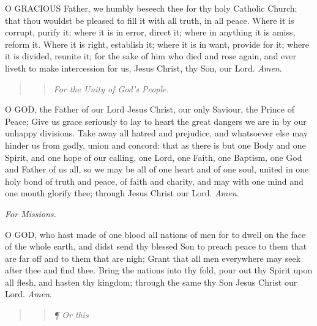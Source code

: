 O
GRACIOUS Father, we humbly beseech thee for thy holy Catholic Church;
that thou wouldst be pleased to fill it with all truth, in all peace.
Where it is corrupt, purify it; where it is in error, direct it; where
in anything it is amiss, reform it. Where it is right, establish it; where
it is in want, provide for it; where it is divided, reunite it; for the
sake of him who died and rose again, and ever liveth to make intercession
for us, Jesus Christ, thy Son, our Lord. \emph{Amen}.

\begin{quote}

\begin{quote}

\emph{For
the Unity of God’s People.}

\end{quote}

\end{quote}

O
GOD, the Father of our Lord Jesus Christ, our only Saviour, the Prince
of Peace; Give us grace seriously to lay to heart the great dangers we
are in by our unhappy divisions. Take away all hatred and prejudice, and
whatsoever else may hinder us from godly, union and concord: that as there
is but one Body and one Spirit, and one hope of our calling, one Lord,
one Faith, one Baptism, one God and Father of us all, so we may be all
of one heart and of one soul, united in one holy bond of truth and peace,
of faith and charity, and may with one mind and one mouth glorify thee;
through Jesus Christ our Lord. \emph{Amen}.

\emph{For Missions.}

O GOD, who hast made of
one blood all nations of men for to dwell on the face of the whole earth,
and didst send thy blessed Son to preach peace to them that are far off
and to them that are nigh; Grant that all men everywhere may seek after
thee and find thee. Bring the nations into thy fold, pour out thy Spirit
upon all flesh, and hasten thy kingdom; through the same thy Son Jesus
Christ our Lord. \emph{Amen}.

\begin{quote}

\begin{quote}

\emph{¶
Or this}

\end{quote}

\end{quote}

